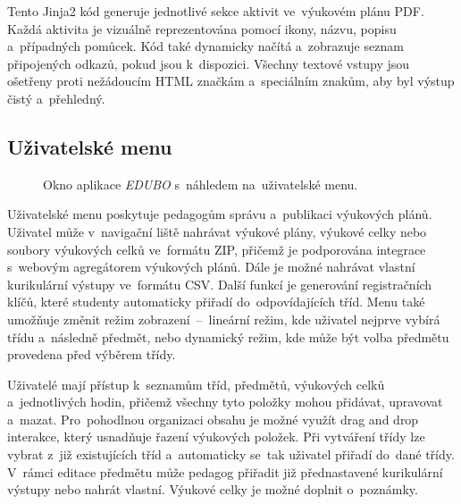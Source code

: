 \documentclass[male,czech,api_bc]{kitheses}
\begin{document}
Tento Jinja2 kód generuje jednotlivé sekce aktivit ve~výukovém plánu PDF. Každá aktivita je vizuálně reprezentována pomocí ikony, názvu, popisu a~případných pomůcek. Kód také dynamicky načítá a~zobrazuje seznam připojených odkazů, pokud jsou k~dispozici. Všechny textové vstupy jsou ošetřeny proti nežádoucím HTML značkám a~speciálním znakům, aby byl výstup čistý a~přehledný.

\subsection{Uživatelské menu}

\begin{figure}[H]
	\centering
	\caption{Okno aplikace \textit{EDUBO} s~náhledem na~uživatelské menu.}
	\label{fig:edubo-4}
\end{figure}

Uživatelské menu poskytuje pedagogům správu a~publikaci výukových plánů. Uživatel může v~navigační liště nahrávat výukové plány, výukové celky nebo soubory výukových celků ve~formátu ZIP, přičemž je podporována integrace s~webovým agregátorem výukových plánů. Dále je možné nahrávat vlastní kurikulární výstupy ve~formátu CSV. Další funkcí je generování registračních klíčů, které studenty automaticky přiřadí do~odpovídajících tříd. Menu také umožňuje změnit režim zobrazení~--~lineární režim, kde uživatel nejprve vybírá třídu a~následně předmět, nebo dynamický režim, kde může být volba předmětu provedena před výběrem třídy.

Uživatelé mají přístup k~seznamům tříd, předmětů, výukových celků a~jednotlivých hodin, přičemž všechny tyto položky mohou přidávat, upravovat a~mazat. Pro~pohodlnou organizaci obsahu je možné využít drag and drop interakce, který usnadňuje řazení výukových položek. Při vytváření třídy lze vybrat z~již existujících tříd a~automaticky se~tak uživatel přiřadí do~dané třídy. V~rámci editace předmětu může pedagog přiřadit již přednastavené kurikulární výstupy nebo nahrát vlastní. Výukové celky je možné doplnit o~poznámky.
\end{document}
